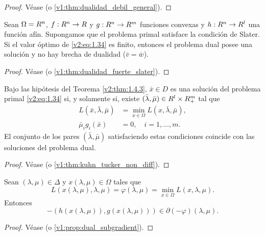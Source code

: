 \begin{proof}
    Véase \cite{izmailov2020otimizacaovolume1} (o \cref{v1:thm:dualidad_debil_general}).
\end{proof}

\begin{theorem}\label{v2:thm:1.4.3}
    Sean $\Omega = R^n$, $f : R^n \to R$ y $g : R^n \to R^m$ funciones convexas y $h : R^n \to R^l$ una función afín. Supongamos que el problema primal satisface la condición de Slater.
    Si el valor óptimo de \eqref{v2:eq:1.34} es finito, entonces el problema dual posee una solución y no hay brecha de dualidad ($\bar{v} = \bar{w}$).
\end{theorem}

\begin{proof}
    Véase \cite{izmailov2020otimizacaovolume1} (o \cref{v1:thm:dualidad_fuerte_slater}).
\end{proof}

\begin{theorem}\label{v2:thm:1.4.4}
    Bajo las hipótesis del Teorema \ref{v2:thm:1.4.3}, $\bar{x} \in D$ es una solución del problema primal \eqref{v2:eq:1.34} si, y solamente si, existe $(\bar{\lambda}, \bar{\mu}) \in R^l \times R^m_+$ tal que
    \begin{align}
        L(\bar{x}, \bar{\lambda}, \bar{\mu}) &= \min_{x \in \Omega} L(x, \bar{\lambda}, \bar{\mu}), \label{v2:eq:1.38} \\
        \bar{\mu}_i g_i(\bar{x}) &= 0, \quad i = 1, \dots, m. \label{v2:eq:1.39}
    \end{align}
    El conjunto de los pares $(\bar{\lambda}, \bar{\mu})$ satisfaciendo estas condiciones coincide con las soluciones del problema dual.
\end{theorem}

\begin{proof}
    Véase \cite{izmailov2020otimizacaovolume1} (o \cref{v1:thm:kuhn_tucker_non_diff}).
\end{proof}

\begin{proposition}\label{v2:prop:1.4.1}
    Sean $(\lambda, \mu) \in \Delta$ y $x(\lambda, \mu) \in \Omega$ tales que
    \[
        L(x(\lambda, \mu), \lambda, \mu) = \varphi(\lambda, \mu) = \min_{x \in \Omega} L(x, \lambda, \mu).
    \]
    Entonces
    \[
        -(h(x(\lambda, \mu)), g(x(\lambda, \mu))) \in \partial(-\varphi)(\lambda, \mu).
    \]
\end{proposition}

\begin{proof}
    Véase \cite{izmailov2020otimizacaovolume1} (o \cref{v1:prop:dual_subgradient}).
\end{proof}